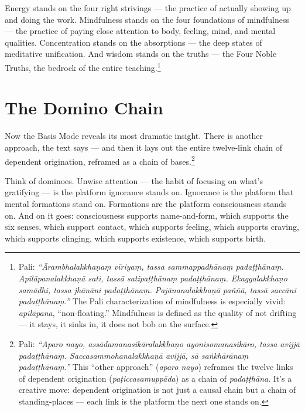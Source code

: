 Energy stands on the four right strivings --- the practice of actually showing up and doing the work. Mindfulness stands on the four foundations of mindfulness --- the practice of paying close attention to body, feeling, mind, and mental qualities. Concentration stands on the absorptions --- the deep states of meditative unification. And wisdom stands on the truths --- the Four Noble Truths, the bedrock of the entire teaching.\footnote{Pali: \textit{``Ārambhalakkhaṇaṃ vīriyaṃ, tassa sammappadhānaṃ padaṭṭhānaṃ. Apilāpanalakkhaṇā sati, tassā satipaṭṭhānaṃ padaṭṭhānaṃ. Ekaggalakkhaṇo samādhi, tassa jhānāni padaṭṭhānaṃ. Pajānanalakkhaṇā paññā, tassā saccāni padaṭṭhānaṃ.''} The Pali characterization of mindfulness is especially vivid: \textit{apilāpana}, ``non-floating.'' Mindfulness is defined as the quality of not drifting --- it stays, it sinks in, it does not bob on the surface.}

\section*{The Domino Chain}

Now the Basis Mode reveals its most dramatic insight. There is another approach, the text says --- and then it lays out the entire twelve-link chain of dependent origination, reframed as a chain of bases.\footnote{Pali: \textit{``Aparo nayo, assādamanasikāralakkhaṇo ayonisomanasikāro, tassa avijjā padaṭṭhānaṃ. Saccasammohanalakkhaṇā avijjā, sā saṅkhārānaṃ padaṭṭhānaṃ.''} This ``other approach'' (\textit{aparo nayo}) reframes the twelve links of dependent origination (\textit{paṭiccasamuppāda}) as a chain of \textit{padaṭṭhāna}. It's a creative move: dependent origination is not just a causal chain but a chain of standing-places --- each link is the platform the next one stands on.}

Think of dominoes. Unwise attention --- the habit of focusing on what's gratifying --- is the platform ignorance stands on. Ignorance is the platform that mental formations stand on. Formations are the platform consciousness stands on. And on it goes: consciousness supports name-and-form, which supports the six senses, which support contact, which supports feeling, which supports craving, which supports clinging, which supports existence, which supports birth.


